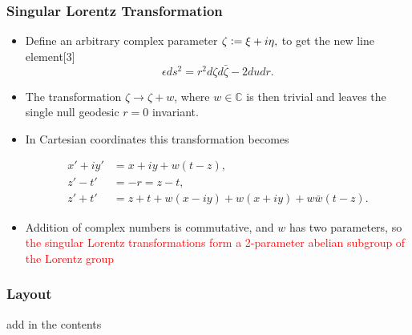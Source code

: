 \documentclass[10pt,a4paper]{beamer}
\begin{document}
\begin{frame}
\frametitle{Singular Lorentz Transformation}
\begin{itemize}
\item<1->{Define an arbitrary complex parameter $\zeta \vcentcolon= \xi + i \eta ,$ to get the new line element[3] $$\epsilon {ds^2} = r^2 {d\zeta}{d\bar{\zeta}} - 2 {du}{dr}.$$}
\item<2->{The transformation $\zeta \rightarrow \zeta + w$, where $w \in \mathbb{C}$ is then trivial and leaves the single null geodesic $r = 0$ invariant.}
\item<3->{In Cartesian coordinates this transformation becomes

\begin{align}\nonumber
x' + i y' & = x + iy + w(t-z), \\\nonumber
z' - t' & = -r = z - t, \\\nonumber
z' + t' & = z+t + w(x - i y) + w(x + iy) + w\bar{w} (t-z).
\end{align}
}
\item<4->{Addition of complex numbers is commutative, and $w$ has two parameters, so \textcolor{red}{the singular Lorentz transformations form a 2-parameter abelian subgroup of the Lorentz group}}

\end{itemize}


\end{frame}

\begin{frame}
\frametitle{Layout}
add in the contents

\end{frame}
\end{document}
